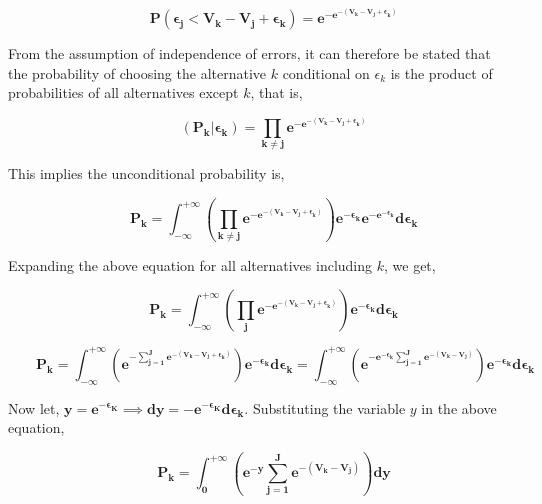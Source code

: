 \documentclass[a4paper,11pt]{article}
\begin{document}
    \begin{equation*}
        \qquad \mathbf{P(\epsilon_{j} < V_{k} - V_{j} + \epsilon_{k}) = e^{-e^{-(V_{k} - V_{j} + \epsilon_{k})}}}
    \end{equation*}

    From the assumption of independence of errors, it can therefore be stated that the probability of choosing the alternative $k$ conditional on $\epsilon_{k}$ is the product of probabilities of all alternatives except $k$, that is,

    \begin{equation*}
        \qquad \mathbf{(P_{k}|\epsilon_{k}) = \prod_{k \neq j}e^{-e^{-(V_{k} - V_{j} + \epsilon_{k})}}}
    \end{equation*}

    This implies the unconditional probability is,

    \begin{equation*}
        \qquad \mathbf{P_{k} = \int_{-\infty}^{+\infty} \left(\prod_{k \neq j}e^{-e^{-(V_{k} - V_{j} + \epsilon_{k})}}\right)e^{-\epsilon_{k}}e^{-e^{-\epsilon_{k}}}d\epsilon_{k}}
    \end{equation*}

    Expanding the above equation for all alternatives including $k$, we get,

    \begin{equation*}
        \qquad \mathbf{P_{k} = \int_{-\infty}^{+\infty} \left(\prod_{j}e^{-e^{-(V_{k} - V_{j} + \epsilon_{k})}}\right)e^{-\epsilon_{k}}d\epsilon_{k}}
    \end{equation*}

    \begin{equation*}
        \qquad \mathbf{P_{k} = \int_{-\infty}^{+\infty} \left(e^{-\sum_{j=1}^{J}e^{-\left(V_{k} - V_{j} + \epsilon_{k}\right)}}\right)e^{-\epsilon_{k}}d\epsilon_{k} = \int_{-\infty}^{+\infty} \left(e^{-e^{-\epsilon_{k}}\sum_{j=1}^{J}e^{-\left(V_{k} - V_{j}\right)}}\right)e^{-\epsilon_{k}}d\epsilon_{k}}
    \end{equation*}

    Now let, $\mathbf{y = e^{-\epsilon_{K}} \implies dy = -e^{-\epsilon_{K}}d\epsilon_{k}}$. Substituting the variable $y$ in the above equation,

    \begin{equation*}
        \qquad \mathbf{P_{k} = \int_{0}^{+\infty} \left(e^{-y}\sum_{j=1}^{J}e^{-\left(V_{k} - V_{j}\right)}\right)dy}
    \end{equation*}
\end{document}
